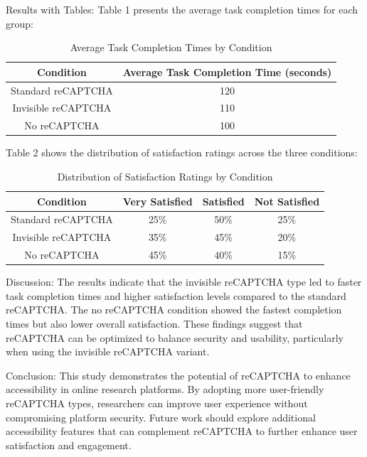 Results with Tables:
Table 1 presents the average task completion times for each group:

\begin{table}[ht]
\centering
\begin{tabular}{|c|c|}
\hline
\textbf{Condition} & \textbf{Average Task Completion Time (seconds)} \\ \hline
Standard reCAPTCHA & 120 \\
Invisible reCAPTCHA & 110 \\
No reCAPTCHA & 100 \\ \hline
\end{tabular}
\caption{Average Task Completion Times by Condition}
\label{tab:completion_times}
\end{table}

Table 2 shows the distribution of satisfaction ratings across the three conditions:

\begin{table}[ht]
\centering
\begin{tabular}{|c|c|c|c|}
\hline
\textbf{Condition} & \textbf{Very Satisfied} & \textbf{Satisfied} & \textbf{Not Satisfied} \\ \hline
Standard reCAPTCHA & 25\% & 50\% & 25\% \\
Invisible reCAPTCHA & 35\% & 45\% & 20\% \\
No reCAPTCHA & 45\% & 40\% & 15\% \\ \hline
\end{tabular}
\caption{Distribution of Satisfaction Ratings by Condition}
\label{tab:satisfaction_ratings}
\end{table}

Discussion:
The results indicate that the invisible reCAPTCHA type led to faster task completion times and higher satisfaction levels compared to the standard reCAPTCHA. The no reCAPTCHA condition showed the fastest completion times but also lower overall satisfaction. These findings suggest that reCAPTCHA can be optimized to balance security and usability, particularly when using the invisible reCAPTCHA variant.

Conclusion:
This study demonstrates the potential of reCAPTCHA to enhance accessibility in online research platforms. By adopting more user-friendly reCAPTCHA types, researchers can improve user experience without compromising platform security. Future work should explore additional accessibility features that can complement reCAPTCHA to further enhance user satisfaction and engagement.


